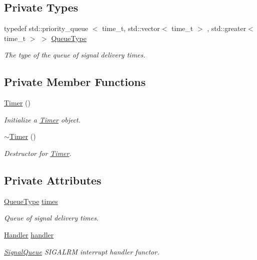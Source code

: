 \subsection*{\-Private \-Types}
\begin{DoxyCompactItemize}
\item 
typedef std\-::priority\-\_\-queue\*
$<$ time\-\_\-t, std\-::vector$<$ time\-\_\-t $>$\*
, std\-::greater$<$ time\-\_\-t $>$ $>$ \hyperlink{classLibWheel_1_1Timer_abea53b00b28de4989a20f6719d3c7b82}{\-Queue\-Type}
\begin{DoxyCompactList}\small\item\em \-The type of the queue of signal delivery times. \end{DoxyCompactList}\end{DoxyCompactItemize}
\subsection*{\-Private \-Member \-Functions}
\begin{DoxyCompactItemize}
\item 
\hyperlink{classLibWheel_1_1Timer_a677a18f1a2e24af2017b54a35aa63bb0}{\-Timer} ()
\begin{DoxyCompactList}\small\item\em \-Initialize a \hyperlink{classLibWheel_1_1Timer}{\-Timer} object. \end{DoxyCompactList}\item 
\hyperlink{classLibWheel_1_1Timer_a2fb65c07b581d71a46cd0449a97462d2}{$\sim$\-Timer} ()
\begin{DoxyCompactList}\small\item\em \-Destructor for \hyperlink{classLibWheel_1_1Timer}{\-Timer}. \end{DoxyCompactList}\end{DoxyCompactItemize}
\subsection*{\-Private \-Attributes}
\begin{DoxyCompactItemize}
\item 
\hyperlink{classLibWheel_1_1Timer_abea53b00b28de4989a20f6719d3c7b82}{\-Queue\-Type} \hyperlink{classLibWheel_1_1Timer_a5c5886cc2443434a20b1bd4a41ede304}{times}
\begin{DoxyCompactList}\small\item\em \-Queue of signal delivery times. \end{DoxyCompactList}\item 
\hyperlink{classLibWheel_1_1Timer_1_1Handler}{\-Handler} \hyperlink{classLibWheel_1_1Timer_a0091ca33fd5f8dae22594e39525ef5bc}{handler}
\begin{DoxyCompactList}\small\item\em \hyperlink{classLibWheel_1_1SignalQueue}{\-Signal\-Queue} \-S\-I\-G\-A\-L\-R\-M interrupt handler functor. \end{DoxyCompactList}\end{DoxyCompactItemize}


